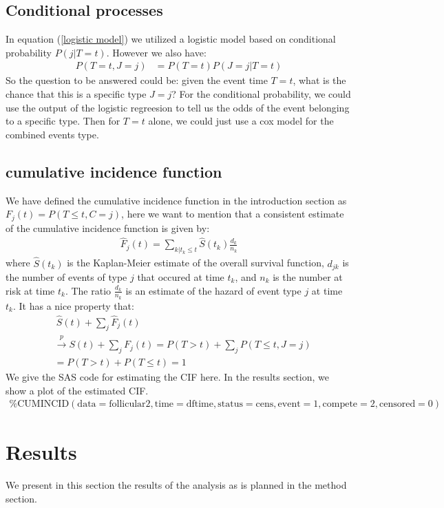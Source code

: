 \documentclass[times, doublespace]{simauth}
\begin{document}
\subsection{Conditional processes}
In equation (\ref{logistic model}) we utilized a logistic model based on conditional probability $P(j|T = t)$. However we also have:
\begin{align*}
	P(T = t, J = j) &= P(T =t )P(J = j|T = t)
\end{align*}
So the question to be answered could be: given the event time $T =t$, what is the chance that this is a specific type $J = j$? For the conditional probability, we could use the output of the logistic regreesion to tell us the odds of the event belonging to a specific type. Then for $T = t$ alone, we could just use a cox model for the combined events type.

\subsection{cumulative incidence function}
We have defined the cumulative incidence function in the introduction section as $F_j(t) = P(T \leq t, C = j)$, here we want to mention that a consistent estimate of the cumulative incidence function is given by:
\begin{align*}
	\hat{F}_j(t) = \sum_{k|t_k \leq t} \hat{S}(t_k)\frac{d_k}{n_k}	
\end{align*}
where $\hat{S}(t_k)$ is the Kaplan-Meier estimate of the overall survival function, $d_{jk}$ is the number of events of type $j$ that occured at time $t_k$, and $n_k$ is the number at risk at time $t_k$. The ratio $\frac{d_k}{n_k}$ is an estimate of the hazard of event type $j$ at time $t_k$. It has a nice property that:
\begin{align*}
	&\ \hat{S}(t) + \sum_j \hat{F}_j(t)\\
	&\stackrel{p}{\to }S(t) + \sum_j F_j(t) = P(T > t) + \sum_j P(T \leq t, J = j)\\
	&= P(T > t) + P(T \leq t) = 1 
\end{align*}
We give the SAS code for estimating the CIF here. In the results section, we show a plot of the estimated CIF.
\begin{align*}
	\%\text{CUMINCID}(\text{data} = \text{follicular}2, \text{time} = \text{dftime}, \text{status} = \text{cens}, \text{event} = 1, \text{compete} = 2, \text{censored} = 0)
\end{align*}

\section{Results}
We present in this section the results of the analysis as is planned in the method section.
\end{document}
